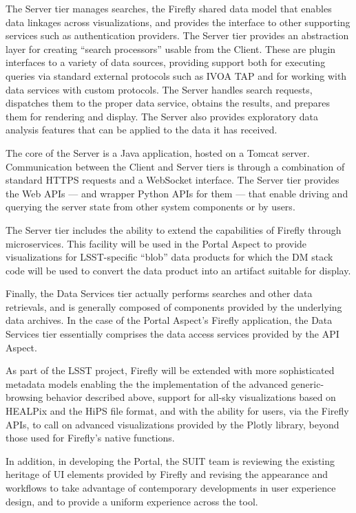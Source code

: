 The Server tier manages searches, the Firefly shared data model that enables data linkages across visualizations, and provides the interface to other supporting services such as authentication providers.
The Server tier provides an abstraction layer for creating ``search processors'' usable from the Client.
These are plugin interfaces to a variety of data sources, providing support both for executing queries via standard external protocols such as IVOA TAP and for working with data services with custom protocols.
The Server handles search requests, dispatches them to the proper data service, obtains the results,
and prepares them for rendering and display.
The Server also provides exploratory data analysis features that can be applied to the data it has received.

The core of the Server is a Java application, hosted on a Tomcat server.
Communication between the Client and Server tiers is through a combination of standard HTTPS requests and a WebSocket interface.
The Server tier provides the Web APIs --- and wrapper Python APIs for them --- that enable driving and querying the server state from other system components or by users.

The Server tier includes the ability to extend the capabilities of Firefly through microservices.
This facility will be used in the Portal Aspect to provide visualizations for LSST-specific ``blob'' data products for which the DM stack code will be used to convert the data product into an artifact suitable for display.

Finally, the Data Services tier actually performs searches and other data retrievals, and is generally composed of components provided by the underlying data archives.
In the case of the Portal Aspect's Firefly application, the Data Services tier essentially comprises the data access services provided by the API Aspect.

As part of the LSST project, Firefly will be extended with more sophisticated metadata models enabling the the implementation of the advanced generic-browsing behavior described above, support for all-sky visualizations based on HEALPix and the HiPS file format, and with the ability for users, via the Firefly APIs, to call on advanced visualizations provided by the Plotly library, beyond those used for Firefly's native functions.

In addition, in developing the Portal, the SUIT team is reviewing the existing heritage of UI elements provided by Firefly and revising the appearance and workflows to take advantage of contemporary developments in user experience design, and to provide a uniform experience across the tool.

